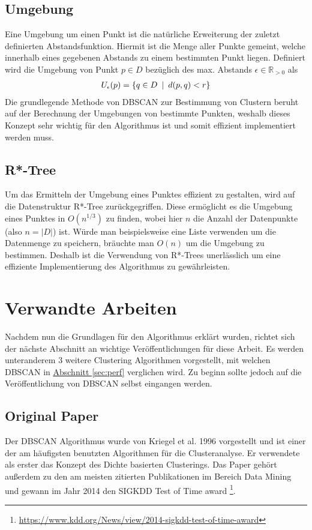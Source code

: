 \documentclass{lni}
\begin{document}
\subsection{Umgebung}
Eine Umgebung um einen Punkt ist die natürliche Erweiterung der zuletzt definierten Abstandsfunktion. Hiermit ist die Menge aller Punkte gemeint, welche innerhalb eines gegebenen Abstands zu einem bestimmten Punkt liegen.
Definiert wird die Umgebung von Punkt $p \in D$ bezüglich des max. Abstands $\epsilon \in \mathbb{R}_{>0}$ als
\begin{align}
    U_{\epsilon}(p) = \{ q \in D \enspace | \enspace d(p,q) < r \} \notag
\end{align}
Die grundlegende Methode von DBSCAN zur Bestimmung von Clustern beruht auf der Berechnung der Umgebungen von bestimmte Punkten, weshalb dieses Konzept sehr wichtig für den Algorithmus ist und somit effizient implementiert werden muss.


\subsection{R*-Tree}
\label{sec:rtree}
Um das Ermitteln der Umgebung eines Punktes effizient zu gestalten, wird auf die Datenstruktur R*-Tree \cite{R*} zurückgegriffen. Diese ermöglicht es die Umgebung eines Punktes in $O(n^{1/3})$ \cite{REV} zu finden, wobei hier $n$ die Anzahl der Datenpunkte (also $n = |D|$) ist. Würde man beispielsweise eine Liste verwenden um die Datenmenge zu speichern, bräuchte man $O(n)$ um die Umgebung zu bestimmen. Deshalb ist die Verwendung von R*-Trees unerlässlich um eine effiziente Implementierung des Algorithmus zu gewährleisten.

%
%

\section{Verwandte Arbeiten}
Nachdem nun die Grundlagen für den Algorithmus erklärt wurden, richtet sich der nächste Abschnitt an wichtige Veröffentlichungen für diese Arbeit. Es werden unteranderem 3 weitere Clustering Algorithmen vorgestellt, mit welchen DBSCAN in \hyperref[sec:perf]{Abschnitt \ref{sec:perf}} verglichen wird. Zu beginn sollte jedoch auf die Veröffentlichung von DBSCAN selbst eingangen werden.


\subsection{Original Paper}
Der DBSCAN Algorithmus wurde von Kriegel et al. 1996 vorgestellt \cite{DBSCAN} und ist einer der am häufigsten benutzten Algorithmen für die Clusteranalyse. Er verwendete als erster das Konzept des Dichte basierten Clusterings. Das Paper gehört außerdem zu den am meisten zitierten Publikationen im Bereich Data Mining und gewann im Jahr 2014 den \glqq SIGKDD Test of Time award \grqq{} \footnote{\href{https://www.kdd.org/News/view/2014-sigkdd-test-of-time-award}{https://www.kdd.org/News/view/2014-sigkdd-test-of-time-award}}.
\end{document}

